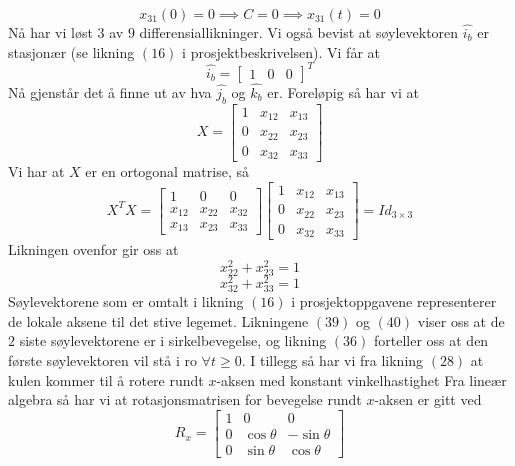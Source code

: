 \begin{equation}
    x_{31}(0)=0\implies C=0\implies x_{31}(t)=0
\end{equation}
Nå har vi løst $3$ av $9$ differensiallikninger. Vi også bevist at søylevektoren $\hat{i_b}$ er stasjonær (se likning $(16)$ i prosjektbeskrivelsen). Vi får at
\begin{equation}
\hat{i_b}=\begin{bmatrix}1&0&0\end{bmatrix}^T
\end{equation}
Nå gjenstår det å finne ut av hva $\hat{j_b}$ og $\hat{k_b}$ er. Foreløpig så har vi at
\begin{equation}
    X=\begin{bmatrix}1&x_{12}&x_{13}\\0&x_{22}&x_{23}\\0&x_{32}&x_{33}\end{bmatrix}
\end{equation}
Vi har at $X$ er en ortogonal matrise, så
\begin{equation}
    X^TX=\begin{bmatrix}1&0&0\\x_{12}&x_{22}&x_{32}\\x_{13}&x_{23}&x_{33}\end{bmatrix}\begin{bmatrix}1&x_{12}&x_{13}\\0&x_{22}&x_{23}\\0&x_{32}&x_{33}\end{bmatrix}=Id_{3\times3}
\end{equation}
Likningen ovenfor gir oss at
\begin{equation}
    x_{22}^2+x_{23}^2=1
\end{equation}
\begin{equation}
    x_{32}^2+x_{33}^2=1
\end{equation}
Søylevektorene som er omtalt i likning $(16)$ i prosjektoppgavene representerer de lokale aksene til det stive legemet. Likningene $(39)$ og $(40)$ viser oss at de $2$ siste søylevektorene er i sirkelbevegelse, og likning $(36)$ forteller oss at den første søylevektoren vil stå i ro $\forall t\geq0.$ I tillegg så har vi fra likning $(28)$ at kulen kommer til å rotere rundt $x$-aksen med konstant vinkelhastighet\newline\newline
Fra lineær algebra så har vi at rotasjonsmatrisen for bevegelse rundt $x$-aksen er gitt ved
\begin{equation}
    R_x=\begin{bmatrix}1&0&0\\0&\cos\theta&-\sin\theta\\0&\sin\theta&\cos\theta\end{bmatrix}
\end{equation}
